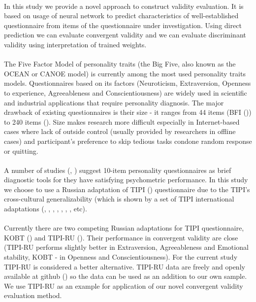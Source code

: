 \documentclass{llncs}
\begin{document}
\paragraph{}
In this study we provide a novel approach to construct validity evaluation. It is based on usage of neural network to predict characteristics of well-established questionnaire from items of the questionnaire under investigation. Using direct prediction we can evaluate convergent validity and we can evaluate discriminant validity using interpretation of trained weights.
\paragraph{}
The Five Factor Model of personality traits (the Big Five, also known as the OCEAN or CANOE model) is currently among the most used personality traits models. Questionnaires based on its factors (Neuroticism, Extraversion, Openness to experience, Agreeableness and Conscientiousness) are widely used in scientific and industrial applications that require personality diagnosis. The major drawback of existing questionnaires is their size - it ranges from 44 items (BFI (\cite{Joh99})) to 240 items (\cite{CM92}). Size makes research more difficult especially in Internet-based cases where lack of outside control (usually provided by researchers in offline cases) and participant's preference to skip tedious tasks condone random response or quitting. 

\paragraph{}
A number of studies (\cite{Cre12}, \cite{Gun15}) suggest 10-item personality questionnaires as brief diagnostic tools for they have satisfying psychometric performance. In this study we choose to use a Russian adaptation of TIPI (\cite{Gos03}) questionnaire due to the TIPI's cross-cultural generalizability (which is shown by a set of TIPI international adaptations (\cite{Her},  \cite{Muc07}, \cite{Hof08}, \cite{Osh12}, \cite{Rom12}, \cite{Ren13}, \cite{Lag14}, \cite{Chi15} etc).

\paragraph{}
Currently there are two competing Russian adaptations for TIPI questionnaire, KOBT (\cite{KT16}) and TIPI-RU (\cite{sergeeva2016translation}). Their performance in convergent validity are close (TIPI-RU performs slightly better in Extraversion, Agreeableness and Emotional stability, KOBT - in Openness and Conscientiousness). For the current study TIPI-RU is considered a better alternative. TIPI-RU data are freely and openly available at github (\cite{TIPIDATA}) so the data can be used as an addition to our own sample. We use TIPI-RU as an example for application of our novel convergent validity evaluation method.
\end{document}
